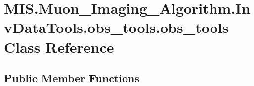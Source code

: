 \hypertarget{classMIS_1_1Muon__Imaging__Algorithm_1_1InvDataTools_1_1obs__tools_1_1obs__tools}{}\section{M\+I\+S.\+Muon\+\_\+\+Imaging\+\_\+\+Algorithm.\+Inv\+Data\+Tools.\+obs\+\_\+tools.\+obs\+\_\+tools Class Reference}
\label{classMIS_1_1Muon__Imaging__Algorithm_1_1InvDataTools_1_1obs__tools_1_1obs__tools}
\subsection*{Public Member Functions}
